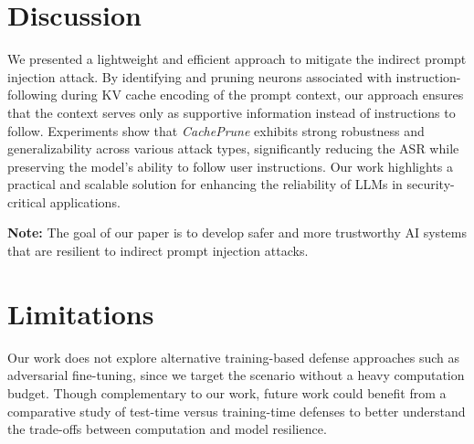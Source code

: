 \documentclass[11pt]{article}
\begin{document}
\section{Discussion}

We presented a lightweight and efficient approach to mitigate the indirect prompt injection attack.
By identifying and pruning neurons associated with
instruction-following during KV cache encoding of the prompt context, 
our approach ensures that the context serves only as supportive information instead of instructions to follow. 
Experiments show that \textit{CachePrune} exhibits strong robustness and generalizability across various attack types, significantly reducing the ASR while preserving the model’s ability to follow user instructions.
Our work highlights a practical and scalable solution for enhancing the reliability of LLMs in security-critical applications.

\textbf{Note:} The goal of our paper is to develop safer and more trustworthy AI systems that are resilient to indirect prompt injection attacks.



\section{Limitations}
Our work does not explore alternative training-based defense approaches such as adversarial fine-tuning, since we target the scenario without a heavy computation budget. 
Though complementary to our work, future work could benefit from a comparative study 
of test-time versus training-time defenses 
to better understand the trade-offs between computation and model resilience.
\end{document}
